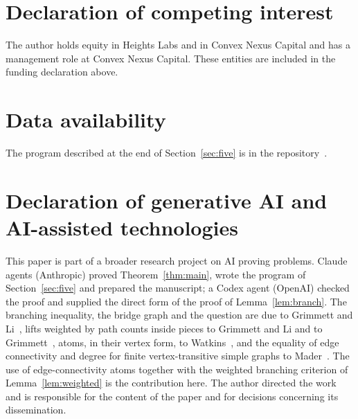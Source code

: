\documentclass[11pt]{amsart}
\theoremstyle{remark}
\begin{document}
\section*{Declaration of competing interest}
The author holds equity in Heights Labs and in Convex Nexus Capital and has a management role at Convex Nexus Capital.
These entities are included in the funding declaration above.

\section*{Data availability}
The program described at the end of Section~\ref{sec:five} is in the repository~\cite{Repo}.

\section*{Declaration of generative AI and AI-assisted technologies}
This paper is part of a broader research project on AI proving problems. Claude agents (Anthropic) proved
Theorem~\ref{thm:main}, wrote the program of Section~\ref{sec:five} and prepared the manuscript; a Codex agent
(OpenAI) checked the proof and supplied the direct form of the proof of Lemma~\ref{lem:branch}. The branching
inequality, the bridge graph and the question are due to Grimmett and Li~\cite{GL15,GL19}, lifts weighted by path counts inside pieces to Grimmett and
Li and to Grimmett~\cite{GL20,Gri26b}, atoms, in their vertex form, to Watkins~\cite{Wat70}, and the equality of edge connectivity and degree for
finite vertex-transitive simple graphs to Mader~\cite{Mad71}. The use of
edge-connectivity atoms together with the weighted branching criterion of Lemma~\ref{lem:weighted} is the
contribution here. The author directed the work and is responsible for the content of the paper
and for decisions concerning its dissemination.
\end{document}
